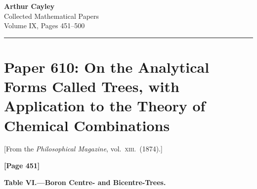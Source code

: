 \documentclass[11pt,a4paper]{book}
\begin{document}
{} %
\clearpage


\begin{center}
{\Large\bfseries Arthur Cayley}\\[6pt]
{\large Collected Mathematical Papers}\\[4pt]
{\normalsize Volume IX, Pages 451--500}\\[12pt]
\rule{0.6\textwidth}{0.4pt}
\end{center}


\newpage

\newcommand{\sectref}[1]{\textsection\,#1}
\newcommand{\qq}{\quad}

\section{Paper 610: On the Analytical Forms Called Trees, with Application to the Theory of Chemical Combinations}

\begin{center}
{\small[From the \textit{Philosophical Magazine}, vol.\ \textsc{xiii}.\ (1874).]}
\end{center}

\textbf{[Page 451]}

\begin{center}
\textbf{Table VI.---Boron Centre- and Bicentre-Trees.}
\end{center}
\end{document}
